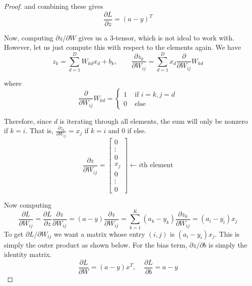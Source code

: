 \begin{proof}
    and combining these gives 
    \begin{equation}
      \frac{\partial L}{\partial z} = (a - y)^T
    \end{equation}
   
    Now, computing $\partial z / \partial W$ gives us a $3$-tensor, which is not ideal to work with. However, let us just compute this with respect to the elements again. We have 
    \begin{equation}
      z_k = \sum_{d=1}^D W_{kd} x_d + b_k, \qquad \frac{\partial z_k}{\partial W_{ij}} = \sum_{d=1}^D x_d \frac{\partial}{\partial W_{ij}} W_{kd}
    \end{equation}
   
    where 
    \begin{equation}
      \frac{\partial}{\partial W_{ij}} W_{kd} = \begin{cases} 
        1 & \text{ if } i = k, j = d \\ 
        0 & \text{ else} 
      \end{cases}
    \end{equation}
   
    Therefore, since $d$ is iterating through all elements, the sum will only be nonzero if $k = i$. That is, $\frac{\partial z_k}{\partial W_{ij}} = x_j$ if $k = i$ and $0$ if else. 
    \begin{equation}
      \frac{\partial z}{\partial W_{ij}} = \begin{bmatrix}
      0 \\
      \vdots \\
      0 \\
      x_j \\
      0 \\
      \vdots \\
      0
      \end{bmatrix} \leftarrow i\text{th element} 
    \end{equation}
   
    Now computing 
    \begin{equation}
      \frac{\partial L}{\partial W_{ij}} = \frac{\partial L}{\partial z} \frac{\partial z}{\partial W_{ij}} = (a - y) \frac{\partial z}{\partial W_{ij}} = \sum_{k=1}^K (a_k - y_k) \frac{\partial z_k}{\partial W_{ij}} = (a_i - y_i) x_j
    \end{equation}
    To get $\partial L / \partial W_{ij}$ we want a matrix whose entry $(i, j)$ is $(a_i - y_i) x_j$. This is simply the outer product as shown below. For the bias term, $\partial z / \partial b$ is simply the identity matrix. 
    \begin{equation}
      \frac{\partial L}{\partial W} = (a - y) x^T, \;\;\;\; \frac{\partial L}{\partial b} = a - y
    \end{equation}
   

\end{proof}
